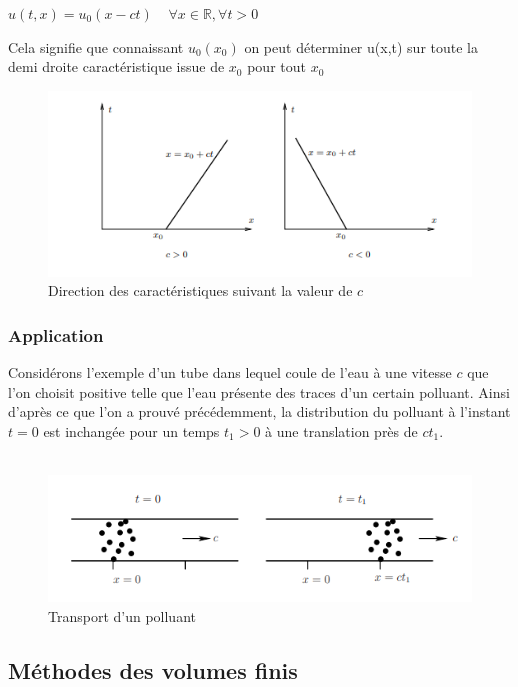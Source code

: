 \documentclass[12pt]{article}
\begin{document}
\begin{center}
        $u(t,x)=u_0(x-ct) \;\;\;\;\forall x\in \mathbb{R}, \forall t>0 $
\end{center}
 Cela signifie que connaissant $u_0(x_0)$ on peut déterminer u(x,t) sur toute la demi droite caractéristique issue de $x_0$ pour tout $x_0$
\\
\begin{figure}[H]
	\centering
	\includegraphics[scale=1]{dr.png}
	\caption{Direction des caractéristiques suivant la valeur de $c$}
	\label{1D}
	\end{figure}
\newpage
\subsubsection{Application}
Considérons l'exemple d'un tube dans lequel coule de l'eau à une vitesse $c$ que l'on choisit positive telle que l'eau présente des traces d'un certain polluant. Ainsi d'après ce que l'on a prouvé précédemment, la distribution du polluant à l'instant $t=0$ est inchangée pour un temps $t_1 > 0$ à une translation près de $ct_1$.
\\
\\\begin{figure}[H]
	\centering
	\includegraphics[scale=1]{transport_de_polluant.png}
	\caption{Transport d'un polluant}
	\label{1D}
	\end{figure}
	
	
\subsection{Méthodes des volumes finis}
\end{document}

